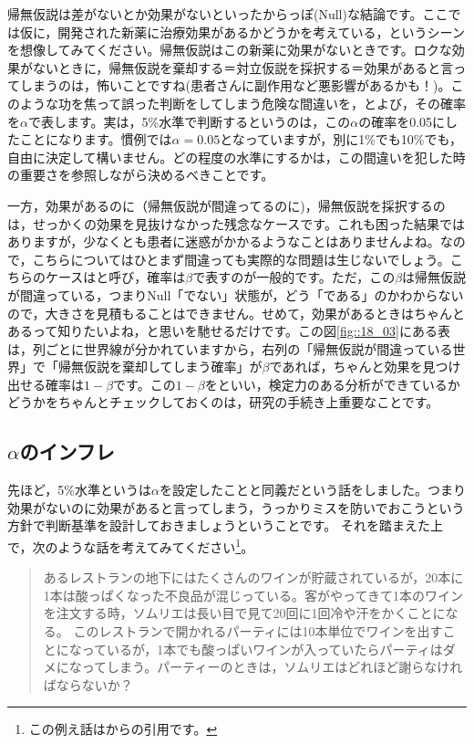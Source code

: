 \documentclass{ltjsbook}
\begin{document}
帰無仮説は差がないとか効果がないといったからっぽ(Null)な結論です。ここでは仮に，開発された新薬に治療効果があるかどうかを考えている，というシーンを想像してみてください。帰無仮説はこの新薬に効果がないときです。ロクな効果がないときに，帰無仮説を棄却する＝対立仮説を採択する＝効果があると言ってしまうのは，怖いことですね(患者さんに副作用など悪影響があるかも！)。このような功を焦って誤った判断をしてしまう危険な間違いを，とよび，その確率を$\alpha$で表します。実は，5\%水準で判断するというのは，この$\alpha$の確率を0.05にしたことになります。慣例では$\alpha=0.05$となっていますが，別に1\%でも10\%でも，自由に決定して構いません。どの程度の水準にするかは，この間違いを犯した時の重要さを参照しながら決めるべきことです。

一方，効果があるのに（帰無仮説が間違ってるのに)，帰無仮説を採択するのは，せっかくの効果を見抜けなかった残念なケースです。これも困った結果ではありますが，少なくとも患者に迷惑がかかるようなことはありませんよね。なので，こちらについてはひとまず間違っても実際的な問題は生じないでしょう。こちらのケースはと呼び，確率は$\beta$で表すのが一般的です。ただ，この$\beta$は帰無仮説が間違っている，つまりNull「でない」状態が，どう「である」のかわからないので，大きさを見積もることはできません。せめて，効果があるときはちゃんとあるって知りたいよね，と思いを馳せるだけです。この図\ref{fig::18_03}にある表は，列ごとに世界線が分かれていますから，右列の「帰無仮説が間違っている世界」で「帰無仮説を棄却してしまう確率」が$\beta$であれば，ちゃんと効果を見つけ出せる確率は$1-\beta$です。この$1-\beta$をといい，検定力のある分析ができているかどうかをちゃんとチェックしておくのは，研究の手続き上重要なことです。

\subsection{$\alpha$のインフレ}
\label{alphaInfration}
先ほど，5\%水準というは$\alpha$を設定したことと同義だという話をしました。つまり効果がないのに効果があると言ってしまう，うっかりミスを防いでおこうという方針で判断基準を設計しておきましょうということです。
それを踏まえた上で，次のような話を考えてみてください\footnote{この例え話は\textcite{BA33892274}からの引用です。}。
\begin{quote}
	あるレストランの地下にはたくさんのワインが貯蔵されているが，20本に1本は酸っぱくなった不良品が混じっている。客がやってきて1本のワインを注文する時，ソムリエは長い目で見て20回に1回冷や汗をかくことになる。
	このレストランで開かれるパーティには10本単位でワインを出すことになっているが，1本でも酸っぱいワインが入っていたらパーティはダメになってしまう。パーティーのときは，ソムリエはどれほど謝らなければならないか？
\end{quote}
\end{document}
